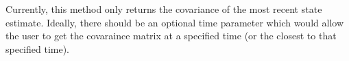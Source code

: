 
\begin{DoxyRefList}
\item[\label{todo__todo000001}%
\hypertarget{todo__todo000001}{}%
Member \hyperlink{classmodest_1_1substates_1_1substate_1_1SubState_a6e308aadd13962e476d2892ec728e3a5}{modest.substates.substate.Sub\+State.covariance} (self)]Currently, this method only returns the covariance of the most recent state estimate. Ideally, there should be an optional time parameter which would allow the user to get the covaraince matrix at a specified time (or the closest to that specified time).
\end{DoxyRefList}